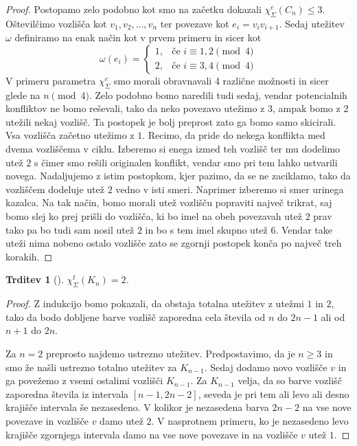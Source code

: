 \documentclass[12pt,a4paper,twoside]{article}
\theoremstyle{definition} %
\theoremstyle{plain} %
\newtheorem{trditev}[definicija]{Trditev}
\newcommand{\ec}{\chi_{\Sigma}^e}
\newcommand{\ect}{\chi_{\Sigma}^t}
\numberwithin{equation}{section}  %
\begin{document}
\begin{proof}
Postopamo zelo podobno kot smo na začetku dokazali $\ec(C_n) \le 3$. Oštevilčimo vozlišča kot $v_1, v_2, \ldots, v_n$ ter povezave kot $e_i = v_iv_{i+1}$. Sedaj utežitev $\omega$ definiramo na enak način kot v prvem primeru in sicer kot
\begin{equation*}
	\omega(e_i) = \begin{cases}
	1, & \text{če } i \equiv 1,2 \pmod{4}\\ 
	2, &\text{če } i \equiv 3,4 \pmod{4}
	\end{cases}
	\end{equation*}
V primeru parametra $\ec$ smo morali obravnavali 4 različne možnosti in sicer glede na $ n \pmod{4}$. Zelo podobno bomo naredili tudi sedaj, vendar potencialnih konfliktov ne bomo reševali, tako da neko povezavo utežimo z $3$, ampak bomo z $2$ utežili nekaj vozlišč. Ta postopek je bolj preprost zato ga bomo samo skicirali. Vsa vozlišča začetno utežimo z $1$. Recimo, da pride do nekega konflikta med dvema vozliščema v ciklu. Izberemo si enega izmed teh vozlišč ter mu dodelimo utež $2$ s čimer smo rešili originalen konflikt, vendar smo pri tem lahko ustvarili novega. Nadaljujemo z istim postopkom, kjer pazimo, da se ne zaciklamo, tako da vozliščem dodeluje utež $2$ vedno v isti smeri. Naprimer izberemo si smer urinega kazalca. Na tak način, bomo morali utež vozlišču popraviti največ trikrat, saj bomo slej ko prej prišli do vozlišča, ki bo imel na obeh povezavah utež $2$ prav tako pa bo tudi sam nosil utež $2$ in bo s tem imel skupno utež $6$. Vendar take uteži nima nobeno ostalo vozlišče zato se zgornji postopek konča po največ treh korakih.
\end{proof}

\begin{trditev}[\citet{12conj}]
$\ect(K_n) = 2$.
\end{trditev}

\begin{proof}
Z indukcijo bomo pokazali, da obstaja totalna utežitev z utežmi $1$ in $2$, tako da bodo dobljene barve vozlišč zaporedna cela števila od $n$ do $2n - 1$ ali od $n+1$ do $2n$. 

Za $n=2$ preprosto najdemo ustrezno utežitev. Predpostavimo, da je $n \ge 3$ in smo že našli ustrezno totalno utežitev za $K_{n-1}$. Sedaj dodamo novo vozlišče $v$ in ga povežemo z vsemi ostalimi vozlišči $K_{n-1}$. Za $K_{n-1}$ velja, da so barve vozlišč zaporedna števila iz intervala $[n-1, 2n - 2]$, seveda je pri tem ali levo ali desno krajišče intervala še nezasedeno. V kolikor je nezasedena barva $2n - 2$ na vse nove povezave in vozlišče $v$ damo utež $2$. V nasprotnem primeru, ko je nezasedeno levo krajišče zgornjega intervala damo na vse nove povezave in na vozlišče $v$ utež $1$.
\end{proof}
\end{document}
